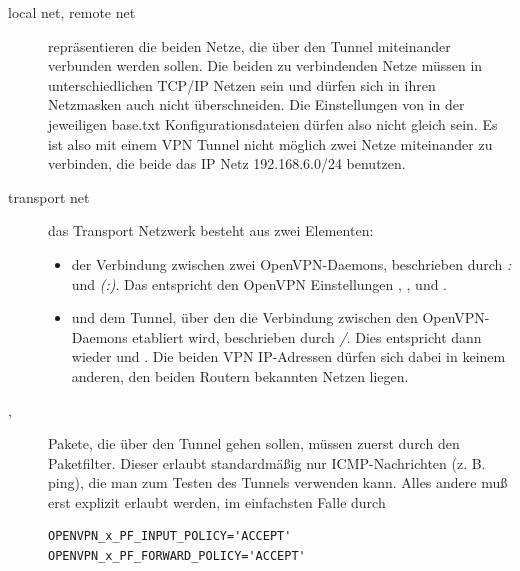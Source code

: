   \begin{description}

  \item [local net, remote net] repräsentieren die beiden Netze, die
  über den Tunnel miteinander verbunden werden sollen. Die beiden zu
  verbindenden Netze müssen in unterschiedlichen TCP/IP Netzen sein
  und dürfen sich in ihren Netzmasken auch nicht überschneiden. Die
  Einstellungen von  in der jeweiligen base.txt
  Konfigurationsdateien dürfen also nicht gleich sein. Es ist also mit
  einem VPN Tunnel nicht möglich zwei Netze miteinander zu verbinden,
  die beide das IP Netz 192.168.6.0/24 benutzen.

  \item [transport net] das Transport Netzwerk besteht aus zwei
  Elementen:

  \begin{itemize}

  \item der Verbindung zwischen zwei OpenVPN-Daemons, beschrieben
  durch \emph{:}
  und \emph{(:)}. Das
  entspricht den OpenVPN Einstellungen ,
  ,  und
  .

  \item und dem Tunnel, über den die Verbindung zwischen den
  OpenVPN-Daemons etabliert wird, beschrieben durch
  \emph{/}. Dies
  entspricht dann wieder  und
  . Die beiden VPN IP-Adressen dürfen sich
  dabei in keinem anderen, den beiden Routern bekannten Netzen liegen.

  \end{itemize}

  \item [,
  ] Pakete, die über den
  Tunnel gehen sollen, müssen zuerst durch den Paketfilter. Dieser
  erlaubt standardmäßig nur ICMP-Nachrichten (z. B. ping), die man
  zum Testen des Tunnels verwenden kann. Alles andere muß erst
  explizit erlaubt werden, im einfachsten Falle durch

\begin{example}
\begin{verbatim}
OPENVPN_x_PF_INPUT_POLICY='ACCEPT'
OPENVPN_x_PF_FORWARD_POLICY='ACCEPT'
\end{verbatim}
\end{example}


  \end{description}

